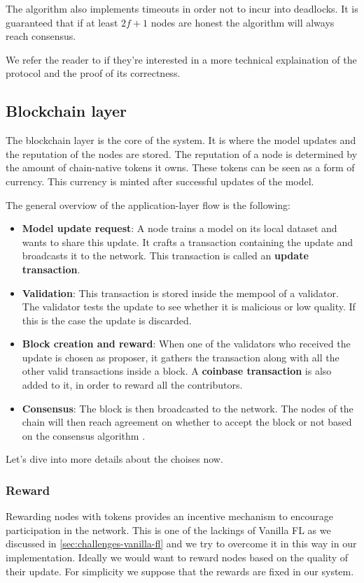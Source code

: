 The algorithm also implements timeouts in order not to incur into deadlocks. It is guaranteed that if at
least $2f + 1$ nodes are honest the algorithm will always reach consensus.

We refer the reader to \cite{Tendermint} if they're interested in a more technical explaination of the
protocol and the proof of its correctness.

\subsection{Blockchain layer}
The blockchain layer is the core of the system. It is where the model updates and the reputation of the nodes
are stored. The reputation of a node is determined by the amount of chain-native tokens it owns. These tokens
can be seen as a form of currency. This currency is minted after successful updates of the model.

The general overviow of the application-layer flow is the following:
\begin{itemize}
  \item \textbf{Model update request}: A node trains a model on its local dataset and wants to share this
    update. It crafts a transaction
    containing the update and broadcasts it to the network. This transaction is called an \textbf{update transaction}.
  \item \textbf{Validation}: This transaction is stored inside the mempool of a validator. The validator
    tests the update to see
    whether it is malicious or low quality. If this is the case the update is discarded.
  \item \textbf{Block creation and reward}: When one of the validators who received the update is chosen as
    proposer, it gathers the transaction
    along with all the other valid transactions inside a block. A \textbf{coinbase transaction} is also added
    to it, in order to reward all the contributors.
  \item \textbf{Consensus}: The block is then broadcasted to the network. The nodes of the chain will then
    reach agreement on
    whether to accept the block or not based on the consensus algorithm \cite{Tendermint}.
\end{itemize}

Let's dive into more details about the choises now.
\subsubsection{Reward}
Rewarding nodes with tokens provides an incentive mechanism to encourage participation in the network.
This is one of the lackings of Vanilla FL as we discussed in \ref{sec:challenges-vanilla-fl} and we try to
overcome it in this way in our implementation. Ideally we would want to reward nodes based on the quality of
their update. For simplicity we suppose that the rewards are fixed in our system.

